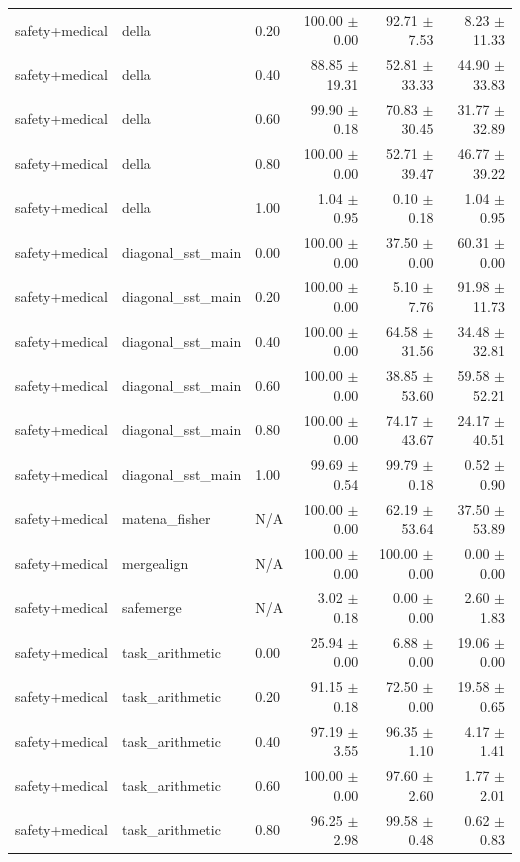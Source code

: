 \documentclass{article}
\begin{document}
\begin{table}[H]
{\begin{tabular}{lllrrr}
safety+medical & della & 0.20 & 100.00 $\pm$ 0.00 & 92.71 $\pm$ 7.53 & 8.23 $\pm$ 11.33 \\
safety+medical & della & 0.40 & 88.85 $\pm$ 19.31 & 52.81 $\pm$ 33.33 & 44.90 $\pm$ 33.83 \\
safety+medical & della & 0.60 & 99.90 $\pm$ 0.18 & 70.83 $\pm$ 30.45 & 31.77 $\pm$ 32.89 \\
safety+medical & della & 0.80 & 100.00 $\pm$ 0.00 & 52.71 $\pm$ 39.47 & 46.77 $\pm$ 39.22 \\
safety+medical & della & 1.00 & 1.04 $\pm$ 0.95 & 0.10 $\pm$ 0.18 & 1.04 $\pm$ 0.95 \\
safety+medical & diagonal\_sst\_main & 0.00 & 100.00 $\pm$ 0.00 & 37.50 $\pm$ 0.00 & 60.31 $\pm$ 0.00 \\
safety+medical & diagonal\_sst\_main & 0.20 & 100.00 $\pm$ 0.00 & 5.10 $\pm$ 7.76 & 91.98 $\pm$ 11.73 \\
safety+medical & diagonal\_sst\_main & 0.40 & 100.00 $\pm$ 0.00 & 64.58 $\pm$ 31.56 & 34.48 $\pm$ 32.81 \\
safety+medical & diagonal\_sst\_main & 0.60 & 100.00 $\pm$ 0.00 & 38.85 $\pm$ 53.60 & 59.58 $\pm$ 52.21 \\
safety+medical & diagonal\_sst\_main & 0.80 & 100.00 $\pm$ 0.00 & 74.17 $\pm$ 43.67 & 24.17 $\pm$ 40.51 \\
safety+medical & diagonal\_sst\_main & 1.00 & 99.69 $\pm$ 0.54 & 99.79 $\pm$ 0.18 & 0.52 $\pm$ 0.90 \\
safety+medical & matena\_fisher & N/A & 100.00 $\pm$ 0.00 & 62.19 $\pm$ 53.64 & 37.50 $\pm$ 53.89 \\
safety+medical & mergealign & N/A & 100.00 $\pm$ 0.00 & 100.00 $\pm$ 0.00 & 0.00 $\pm$ 0.00 \\
safety+medical & safemerge & N/A & 3.02 $\pm$ 0.18 & 0.00 $\pm$ 0.00 & 2.60 $\pm$ 1.83 \\
safety+medical & task\_arithmetic & 0.00 & 25.94 $\pm$ 0.00 & 6.88 $\pm$ 0.00 & 19.06 $\pm$ 0.00 \\
safety+medical & task\_arithmetic & 0.20 & 91.15 $\pm$ 0.18 & 72.50 $\pm$ 0.00 & 19.58 $\pm$ 0.65 \\
safety+medical & task\_arithmetic & 0.40 & 97.19 $\pm$ 3.55 & 96.35 $\pm$ 1.10 & 4.17 $\pm$ 1.41 \\
safety+medical & task\_arithmetic & 0.60 & 100.00 $\pm$ 0.00 & 97.60 $\pm$ 2.60 & 1.77 $\pm$ 2.01 \\
safety+medical & task\_arithmetic & 0.80 & 96.25 $\pm$ 2.98 & 99.58 $\pm$ 0.48 & 0.62 $\pm$ 0.83 \\

\end{tabular}}
\end{table}
\end{document}
